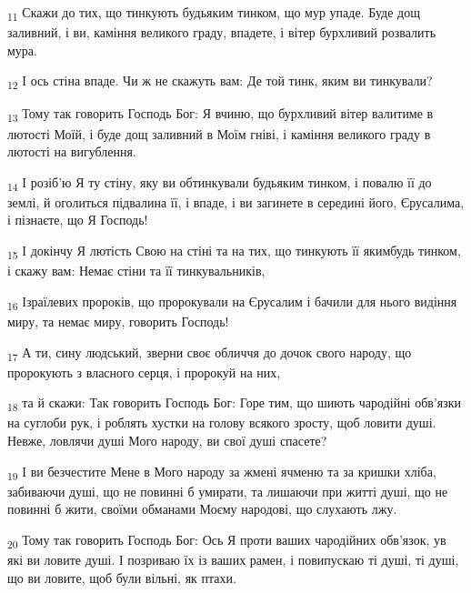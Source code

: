 \begin{tcolorbox}
\textsubscript{11} Скажи до тих, що тинкують будьяким тинком, що мур упаде. Буде дощ заливний, і ви, каміння великого граду, впадете, і вітер бурхливий розвалить мура.
\end{tcolorbox}
\begin{tcolorbox}
\textsubscript{12} І ось стіна впаде. Чи ж не скажуть вам: Де той тинк, яким ви тинкували?
\end{tcolorbox}
\begin{tcolorbox}
\textsubscript{13} Тому так говорить Господь Бог: Я вчиню, що бурхливий вітер валитиме в лютості Моїй, і буде дощ заливний в Моїм гніві, і каміння великого граду в лютості на вигублення.
\end{tcolorbox}
\begin{tcolorbox}
\textsubscript{14} І розіб'ю Я ту стіну, яку ви обтинкували будьяким тинком, і повалю її до землі, й оголиться підвалина її, і впаде, і ви загинете в середині його, Єрусалима, і пізнаєте, що Я Господь!
\end{tcolorbox}
\begin{tcolorbox}
\textsubscript{15} І докінчу Я лютість Свою на стіні та на тих, що тинкують її якимбудь тинком, і скажу вам: Немає стіни та її тинкувальників,
\end{tcolorbox}
\begin{tcolorbox}
\textsubscript{16} Ізраїлевих пророків, що пророкували на Єрусалим і бачили для нього видіння миру, та немає миру, говорить Господь!
\end{tcolorbox}
\begin{tcolorbox}
\textsubscript{17} А ти, сину людський, зверни своє обличчя до дочок свого народу, що пророкують з власного серця, і пророкуй на них,
\end{tcolorbox}
\begin{tcolorbox}
\textsubscript{18} та й скажи: Так говорить Господь Бог: Горе тим, що шиють чародійні обв'язки на суглоби рук, і роблять хустки на голову всякого зросту, щоб ловити душі. Невже, ловлячи душі Мого народу, ви свої душі спасете?
\end{tcolorbox}
\begin{tcolorbox}
\textsubscript{19} І ви безчестите Мене в Мого народу за жмені ячменю та за кришки хліба, забиваючи душі, що не повинні б умирати, та лишаючи при житті душі, що не повинні б жити, своїми обманами Моєму народові, що слухають лжу.
\end{tcolorbox}
\begin{tcolorbox}
\textsubscript{20} Тому так говорить Господь Бог: Ось Я проти ваших чародійних обв'язок, ув які ви ловите душі. І позриваю їх із ваших рамен, і повипускаю ті душі, ті душі, що ви ловите, щоб були вільні, як птахи.
\end{tcolorbox}

